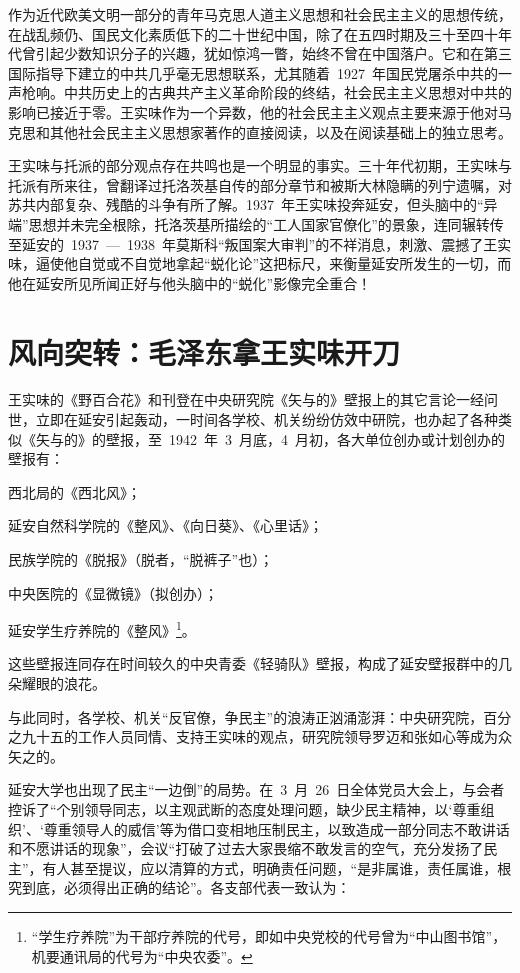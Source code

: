 作为近代欧美文明一部分的青年马克思人道主义思想和社会民主主义的思想传统，在战乱频仍、国民文化素质低下的二十世纪中国，除了在五四时期及三十至四十年代曾引起少数知识分子的兴趣，犹如惊鸿一瞥，始终不曾在中国落户。它和在第三国际指导下建立的中共几乎毫无思想联系，尤其随着~1927~年国民党屠杀中共的一声枪响。中共历史上的古典共产主义革命阶段的终结，社会民主主义思想对中共的影响已接近于零。王实味作为一个异数，他的社会民主主义观点主要来源于他对马克思和其他社会民主主义思想家著作的直接阅读，以及在阅读基础上的独立思考。

王实味与托派的部分观点存在共鸣也是一个明显的事实。三十年代初期，王实味与托派有所来往，曾翻译过托洛茨基自传的部分章节和被斯大林隐瞒的列宁遗嘱，对苏共内部复杂、残酷的斗争有所了解。1937~年王实味投奔延安，但头脑中的“异端”思想并未完全根除，托洛茨基所描绘的“工人国家官僚化”的景象，连同辗转传至延安的~1937~—~1938~年莫斯科“叛国案大审判”的不祥消息，刺激、震撼了王实味，逼使他自觉或不自觉地拿起“蜕化论”这把标尺，来衡量延安所发生的一切，而他在延安所见所闻正好与他头脑中的“蜕化”影像完全重合！

\section{风向突转：毛泽东拿王实味开刀}

王实味的《野百合花》和刊登在中央研究院《矢与的》壁报上的其它言论一经问世，立即在延安引起轰动，一时间各学校、机关纷纷仿效中研院，也办起了各种类似《矢与的》的壁报，至~1942~年~3~月底，4~月初，各大单位创办或计划创办的壁报有：

西北局的《西北风》；

延安自然科学院的《整风》、《向日葵》、《心里话》；

民族学院的《脱报》（脱者，“脱裤子”也）；

中央医院的《显微镜》（拟创办）；

延安学生疗养院的《整风》\footnote{“学生疗养院”为干部疗养院的代号，即如中央党校的代号曾为“中山图书馆”，机要通讯局的代号为“中央农委”。}。

这些壁报连同存在时间较久的中央青委《轻骑队》壁报，构成了延安壁报群中的几朵耀眼的浪花。

与此同时，各学校、机关“反官僚，争民主”的浪涛正汹涌澎湃：中央研究院，百分之九十五的工作人员同情、支持王实味的观点，研究院领导罗迈和张如心等成为众矢之的。

延安大学也出现了民主“一边倒”的局势。在~3~月~26~日全体党员大会上，与会者控诉了“个别领导同志，以主观武断的态度处理问题，缺少民主精神，以‘尊重组织’、‘尊重领导人的威信’等为借口变相地压制民主，以致造成一部分同志不敢讲话和不愿讲话的现象”，会议“打破了过去大家畏缩不敢发言的空气，充分发扬了民主”，有人甚至提议，应以清算的方式，明确责任问题，“是非属谁，责任属谁，根究到底，必须得出正确的结论”。各支部代表一致认为：


